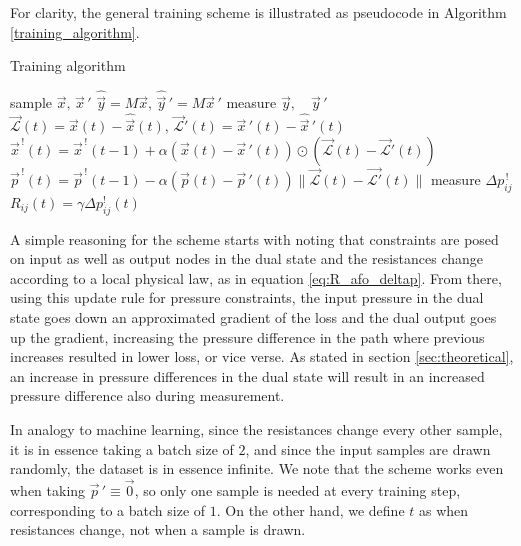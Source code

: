 \documentclass[%
 reprint,
 amsmath,amssymb,
 aps,
]{revtex4-2}
\begin{document}
    For clarity, the general training scheme is illustrated as pseudocode in Algorithm \ref{training_algorithm}.

    \begin{algorithm}
    \caption{Training algorithm}\label{training_algorithm}
    \begin{algorithmic}
        \State sample $\vec{x},\,\vec{x}\,'$ \hfill {}
        \State $\hat{\vec{y}}=M\vec{x},\,\hat{\vec{y}}\,'=M\vec{x}\,'$ \hfill {}
        \State measure $\vec{y}, \quad \vec{y}\,'$ \hfill {}
        \State $\vec{\mathcal{L}}\left(t\right)=\vec{x}\left(t\right)-\hat{\vec{x}}\left(t\right),\,\vec{\mathcal{L}}'\left(t\right)=\vec{x}\,'\left(t\right)-\hat{\vec{x}}\,'\left(t\right)$ \hfill {}
        \State $\vec{x}^{\,!}\left(t\right)=\vec{x}^{\,!}\left(t-1\right)+\alpha\left(\vec{x}\left(t\right)-\vec{x}\,'\left(t\right)\right)\odot\left(\vec{\mathcal{L}}\left(t\right)-\vec{\mathcal{L}}'\left(t\right)\right)$
        \State $\vec{p}^{\,!}\left(t\right)=\vec{p}^{\,!}\left(t-1\right)-\alpha\left(\vec{p}\left(t\right)-\vec{p}\,'\left(t\right)\right)\|\vec{\mathcal{L}}\left(t\right)-\vec{\mathcal{L}'}\left(t\right)\|$
        \State \hfill {} 
        \State measure $\Delta p^{\,!}_{ij}$ \hfill {}
        \State $R_{ij}\left(t\right)=\gamma \Delta p^!_{ij}\left(t\right)$ \hfill {}
    \EndFor
    \end{algorithmic}
    \end{algorithm}

    A simple reasoning for the scheme starts with noting that constraints are posed on input as well as output nodes in the dual state and the resistances change according to a local physical law, as in equation \ref{eq:R_afo_deltap}. 
    From there, using this update rule for pressure constraints, the input pressure in the dual state goes down an approximated gradient of the loss and the dual output goes up the gradient, increasing the pressure difference in the path where previous increases resulted in lower loss, or vice verse. 
    As stated in section \ref{sec:theoretical}, an increase in pressure differences in the dual state will result in an increased pressure difference also during measurement.
    
    In analogy to machine learning, since the resistances change every other sample, it is in essence taking a batch size of $2$, and since the input samples are drawn randomly, the dataset is in essence infinite. We note that the scheme works even when taking $\vec{p}\,'\equiv \vec{0}$, so only one sample is needed at every training step, corresponding to a batch size of $1$. On the other hand, we define $t$ as when resistances change, not when a sample is drawn.
    
\end{document}
